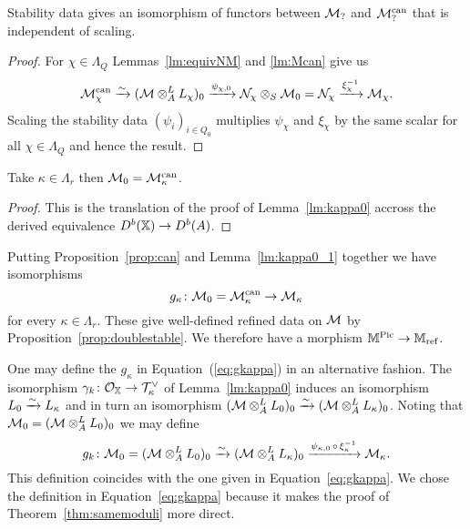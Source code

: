\documentclass[12pt]{amsart}
\begin{document}
\begin{proposition}\label{prop:can}
Stability data gives an isomorphism of functors between $\mathcal{M}_?$ and $\mathcal{M}_?^{\textup{can}}$ that is independent of scaling. 
\end{proposition}

\begin{proof}
For $\chi \in \Lambda_{Q}$ Lemmas~\ref{lm:equivNM} and \ref{lm:Mcan} give us
\begin{equation}\label{eq:phitog}
\mathcal{M}_\chi^\text{can} \xrightarrow{\sim} (\mathcal{M} \otimes_A^L L_\chi)_0 \xrightarrow{\psi_{\chi,0}} \mathcal{N}_\chi \otimes_S \mathcal{M}_0 = \mathcal{N}_\chi \xrightarrow{{\xi_\chi^{-1}}} \mathcal{M}_\chi.
\end{equation}
Scaling the stability data $(\psi_i)_{i\in Q_0}$ multiplies $\psi_\chi$ and $\xi_\chi$ by the same scalar for all $\chi \in \Lambda_Q$ and hence the result.
\end{proof}

\begin{lemma}\label{lm:kappa0_1}
Take $\kappa \in \Lambda_r$ then $\mathcal{M}_0 = \mathcal{M}_\kappa^\textup{can}$.
\end{lemma}

\begin{proof}
This is the translation of the proof of Lemma~\ref{lm:kappa0} accross the derived equivalence $D^b(\mathbb{X}) \rightarrow D^b(A)$.
\end{proof}

Putting Proposition~\ref{prop:can} and Lemma~\ref{lm:kappa0_1} together we have isomorphisms 
\begin{equation}\label{eq:gkappa}
g_\kappa \colon \mathcal{M}_0 = \mathcal{M}_\kappa^{\text{can}} \rightarrow \mathcal{M}_\kappa
\end{equation}
for every $\kappa \in \Lambda_r$.
These give well-defined refined data on $\mathcal{M}$  by Proposition~\ref{prop:doublestable}.
We therefore have a morphism $\mathbb{M}^{\operatorname{Pic}} \rightarrow \mathbb{M}_\text{ref}$.

\begin{remark}
One may define the $g_\kappa$ in Equation~(\ref{eq:gkappa}) in an alternative fashion.
The isomorphism $\gamma_k \colon \mathcal{O}_{\mathbb{X}} \rightarrow \mathcal{T}_\kappa^\vee$ of Lemma~\ref{lm:kappa0} induces an isomorphism $L_0 \xrightarrow{\sim} L_\kappa$ and in turn an isomorphism $(\mathcal{M} \otimes_A^L L_0)_0 \xrightarrow{\sim} (\mathcal{M} \otimes_A^L L_\kappa)_0$.
Noting that $\mathcal{M}_0 = (\mathcal{M} \otimes_A^L L_0)_0$ we may define $$g_k \colon \mathcal{M}_0 = (\mathcal{M} \otimes_A^L L_0)_0 \xrightarrow{\sim} (\mathcal{M} \otimes_A^L L_\kappa)_0 \xrightarrow{\psi_{\kappa,0} \,\circ\, \xi_{\kappa}^{-1}} \mathcal{M}_\kappa.$$
This definition coincides with the one given in Equation~\ref{eq:gkappa}.
We chose the definition in Equation~\ref{eq:gkappa} because it makes the proof of Theorem~\ref{thm:samemoduli} more direct.
\end{remark}
\end{document}

